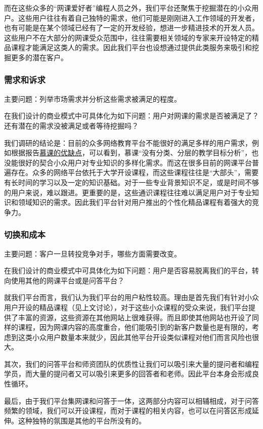 \documentclass[a4paper]{ctexart}
\begin{document}
而在这些众多的“网课爱好者”编程人员之外，我们平台还聚焦于挖掘潜在的小众用户。这些用户往往有着自己独特的需求，他们可能是刚刚进入工作领域的开发者，也有可能是在某个领域已经有了一定的开发经验，想进一步精进技术的开发人员。这些用户不在大部分的网课受众范围中，往往需要相关领域的专家来开设特定的精品课程才能满足这类人的需求。因此我们平台也设想通过提供此类服务来吸引和挖掘更多的潜在客户。

\subsubsection{需求和诉求}
主要问题：列举市场需求并分析这些需求被满足的程度。

在我们设计的商业模式中可具体化为如下问题：用户对网课的需求是否被满足了？还有潜在的需求没被满足或者等待挖掘吗？

我们调研的结论是：目前的众多网络教育平台不能很好的满足多样的用户需求，例如根据报告\href{https://www.jianshu.com/p/36f272b9895a}{慕课的优缺点}，可以看到，慕课“没有分类、分层的教学目标分析”，也没能很好的契合小众用户对专业知识的多样化需求。而这在很多目前的网课平台普遍存在。众多的网络平台依托于大学开设课程，而这些课程往往是“大部头”，需要有长时间的学习以及一定的知识基础。对于一些专业背景知识不足，或是时间不够的用户来说，难以跟进。更重要的是，这些通识课程往往难以满足用户对于专业知识和领域知识的需求。因此我们平台针对用户推出的个性化精品课程有着强大的竞争力。

\subsubsection{切换和成本}
主要问题：客户一旦转投竞争对手，哪些方面需要改变。

在我们设计的商业模式中可具体化为如下问题：用户是否容易脱离我们的平台，转向使用其他的网课平台或是问答平台？

就我们平台而言，我们认为我们平台的用户粘性较高。理由是首先我们有针对小众用户开设的精品课程（见上文讨论），对于这些小众课程的受众来说，我们平台提供了丰富的资源，这些资源在其他网站上很难获得。而且即使其他网站也开设了同样的课程，因为网课内容的高度重合，他们能吸引到的新客户数量也是有限的，考虑到这类小众用户数量本来就少，因此其他平台开设类似课程对他们而言风险也很大。

其次，我们的问答平台和师资团队的优质性让我们可以吸引来大量的提问者和编程学员，而大量的提问者又可以吸引来更多的回答者和老师。因此平台本身会形成良性循环。

最后，由于我们平台集网课和问答于一体，这两部分内容可以相辅相成，对于问答频繁的领域，我们可以开设课程，而对于课程的相关内容，也可以在问答区形成延伸。这种独特的氛围是其他的平台所没有的。
\end{document}
